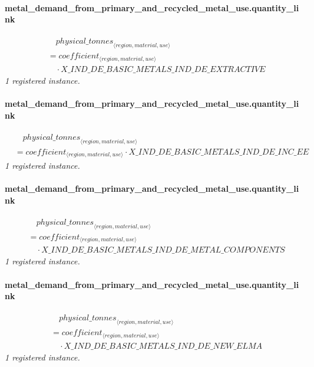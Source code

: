 \documentclass[11pt]{article}
\begin{document}
\paragraph{metal\_demand\_from\_primary\_and\_recycled\_metal\_use.quantity\_link}
\begin{align*}
&\quad {physical\_tonnes}_{\langle region, material, use\rangle}\\
&= coefficient_{\langle region, material, use\rangle}\\
&\quad {}\cdot X\_IND\_DE\_BASIC\_METALS\_IND\_DE\_EXTRACTIVE
\end{align*}
\noindent\emph{1 registered instance.}\par
\paragraph{metal\_demand\_from\_primary\_and\_recycled\_metal\_use.quantity\_link}
\begin{align*}
&\quad {physical\_tonnes}_{\langle region, material, use\rangle}\\
&= coefficient_{\langle region, material, use\rangle} \cdot X\_IND\_DE\_BASIC\_METALS\_IND\_DE\_INC\_EE
\end{align*}
\noindent\emph{1 registered instance.}\par
\paragraph{metal\_demand\_from\_primary\_and\_recycled\_metal\_use.quantity\_link}
\begin{align*}
&\quad {physical\_tonnes}_{\langle region, material, use\rangle}\\
&= coefficient_{\langle region, material, use\rangle}\\
&\quad {}\cdot X\_IND\_DE\_BASIC\_METALS\_IND\_DE\_METAL\_COMPONENTS
\end{align*}
\noindent\emph{1 registered instance.}\par
\paragraph{metal\_demand\_from\_primary\_and\_recycled\_metal\_use.quantity\_link}
\begin{align*}
&\quad {physical\_tonnes}_{\langle region, material, use\rangle}\\
&= coefficient_{\langle region, material, use\rangle}\\
&\quad {}\cdot X\_IND\_DE\_BASIC\_METALS\_IND\_DE\_NEW\_ELMA
\end{align*}
\noindent\emph{1 registered instance.}\par
\end{document}
